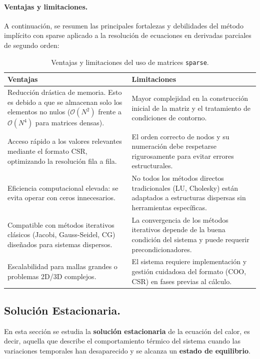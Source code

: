 \documentclass{article}
\begin{document}
\paragraph{Ventajas y limitaciones.} A continuación, se resumen las principales fortalezas y debilidades del método implícito con sparse aplicado a la resolución de ecuaciones en derivadas parciales de segundo orden:
\begin{table}[H]
\centering
\begin{tabular}{|p{6.5cm}|p{6.5cm}|}
\hline
\textbf{Ventajas} & \textbf{Limitaciones} \\
\hline
Reducción drástica de memoria. Esto es debido a que se almacenan solo los elementos no nulos ($\mathcal{O}(N^2)$ frente a $\mathcal{O}(N^4)$ para matrices densas). & Mayor complejidad en la construcción inicial de la matriz y el tratamiento de condiciones de contorno. \\
\hline
Acceso rápido a los valores relevantes mediante el formato CSR, optimizando la resolución fila a fila. & El orden correcto de nodos y su numeración debe respetarse rigurosamente para evitar errores estructurales. \\
\hline
Eficiencia computacional elevada: se evita operar con ceros innecesarios. & No todos los métodos directos tradicionales (LU, Cholesky) están adaptados a estructuras dispersas sin herramientas específicas. \\
\hline
Compatible con métodos iterativos clásicos (Jacobi, Gauss-Seidel, CG) diseñados para sistemas dispersos. & La convergencia de los métodos iterativos depende de la buena condición del sistema y puede requerir precondicionadores. \\
\hline
Escalabilidad para mallas grandes o problemas 2D/3D complejos. & El sistema requiere implementación y gestión cuidadosa del formato (COO, CSR) en fases previas al cálculo. \\
\hline
\end{tabular}
\caption{Ventajas y limitaciones del uso de matrices \texttt{sparse}.}
\end{table}




\newpage
\subsection{Solución Estacionaria.}
\label{subsec:se}
En esta sección se estudia la \textbf{solución estacionaria} de la ecuación del calor, es decir, aquella que describe el comportamiento térmico del sistema cuando las variaciones temporales han desaparecido y se alcanza un \textbf{estado de equilibrio}.\\
\end{document}
